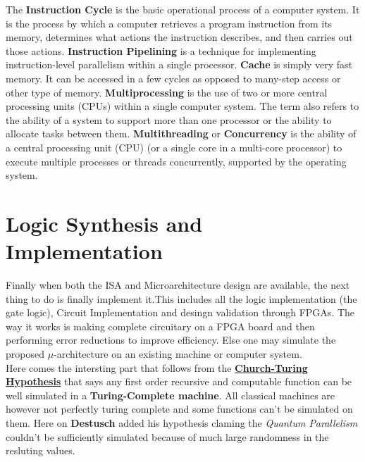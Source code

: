 The \textbf{Instruction Cycle} is the basic operational process of a computer system. It is the process by which a computer retrieves a program instruction from its memory, determines what actions the instruction describes, and then carries out those actions. \textbf{Instruction Pipelining} is a technique for implementing instruction-level parallelism within a single processor. \textbf{Cache} is simply very fast memory. It can be accessed in a few cycles as opposed to many-step access or other type of memory. \textbf{Multiprocessing} is the use of two or more central processing units (CPUs) within a single computer system. The term also refers to the ability of a system to support more than one processor or the ability to allocate tasks between them. \textbf{Multithreading} or \textbf{Concurrency} is the ability of a central processing unit (CPU) (or a single core in a multi-core processor) to execute multiple processes or threads concurrently, supported by the operating system. \\ 

\section{Logic Synthesis and Implementation}

Finally when both the ISA and Microarchitecture design are available, the next thing to do is finally implement it.This includes all the logic implementation (the gate logic), Circuit Implementation and desingn validation through FPGAs. The way it works is making complete circuitary on a FPGA board and then performing error reductions to improve efficiency. Else one may simulate the proposed $\mu$-architecture on an existing machine or computer system.\\


Here comes the intersting part that follows from the \underline{\textbf{Church-Turing Hypothesis}}\cite{church_turing_hyp} that says any first order recursive and computable function can be well simulated in a \textbf{Turing-Complete machine}. All classical machines are however not perfectly turing complete and some functions can't be simulated on them. Here on \textbf{Destusch} added his hypothesis\cite{Geuvers2009} claming the \textit{Quantum Parallelism} couldn't be sufficiently simulated because of much large randomness in the resluting values.
